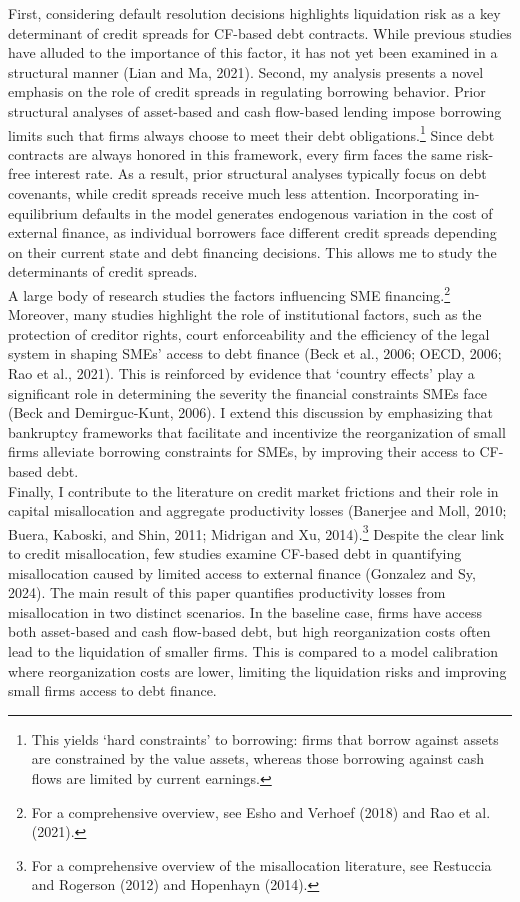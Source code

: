 \documentclass[12pt]{article}
\begin{document}
First, considering default resolution decisions highlights liquidation risk as a key determinant of credit spreads for CF-based debt contracts.  While previous studies have alluded to the importance of this factor, it has not yet been examined in a structural manner (Lian and Ma, 2021). Second, my analysis presents a novel emphasis on the role of credit spreads in regulating borrowing behavior. Prior structural analyses of asset-based and cash flow-based lending impose borrowing limits such that firms always choose to meet their debt obligations.\footnote{This yields `hard constraints' to borrowing: firms that borrow against assets are constrained by the value assets, whereas those borrowing against cash flows are limited by current earnings.} Since debt contracts are always honored in this framework, every firm faces the same risk-free interest rate. As a result, prior structural analyses typically focus on debt covenants, while credit spreads receive much less attention. Incorporating in-equilibrium defaults in the model generates endogenous variation in the cost of external finance, as individual borrowers face different credit spreads depending on their current state and debt financing decisions. This allows me to study the determinants of credit spreads. \vspace{3mm} \\
A large body of research studies the factors influencing SME financing.\footnote{For a comprehensive overview, see Esho and Verhoef (2018) and Rao et al. (2021).} Moreover, many studies highlight the role of institutional factors, such as the protection of creditor rights, court enforceability and the efficiency of the legal system in shaping SMEs' access to debt finance (Beck et al., 2006; OECD, 2006; Rao et al., 2021). This is reinforced by evidence that `country effects' play a significant role in determining the severity the financial constraints SMEs face (Beck and Demirguc-Kunt, 2006). I extend this discussion by emphasizing that bankruptcy frameworks that facilitate and incentivize the reorganization of small firms alleviate borrowing constraints for SMEs, by improving their access to CF-based debt. \vspace{3mm} \\
Finally, I contribute to the literature on credit market frictions and their role in capital misallocation and aggregate productivity losses (Banerjee and Moll, 2010; Buera, Kaboski, and Shin, 2011; Midrigan and Xu, 2014).\footnote{For a comprehensive overview of the misallocation literature, see Restuccia and Rogerson (2012) and Hopenhayn (2014).} Despite the clear link to credit misallocation, few studies examine CF-based debt in quantifying misallocation caused by limited access to external finance (Gonzalez and Sy, 2024). The main result of this paper quantifies productivity losses from misallocation in two distinct scenarios. In the baseline case, firms have access both asset-based and cash flow-based debt, but high reorganization costs often lead to the liquidation of smaller firms. This is compared to a model calibration where reorganization costs are lower, limiting the liquidation risks and improving small firms access to debt finance. 
\end{document}
